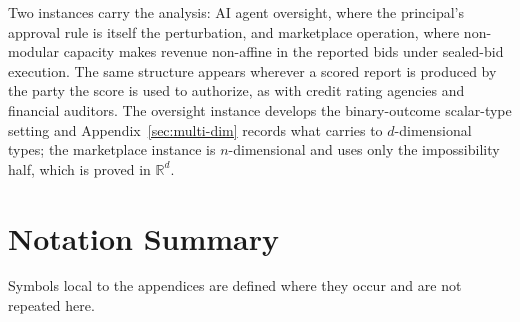\documentclass[acmsmall,nonacm,screen]{acmart}
\theoremstyle{acmplain}%
\theoremstyle{acmdefinition}%
\newcommand{\R}{\mathbb{R}}
\numberwithin{equation}{section}
\begin{document}
Two instances carry the analysis: AI agent oversight, where the principal's approval rule is itself the perturbation, and marketplace operation, where non-modular capacity makes revenue non-affine in the reported bids under sealed-bid execution. The same structure appears wherever a scored report is produced by the party the score is used to authorize, as with credit rating agencies and financial auditors. The oversight instance develops the binary-outcome scalar-type setting and Appendix~\ref{sec:multi-dim} records what carries to $d$-dimensional types; the marketplace instance is $n$-dimensional and uses only the impossibility half, which is proved in $\R^d$.



\section*{Notation Summary}

Symbols local to the appendices are defined where they occur and are not repeated here.
\end{document}
